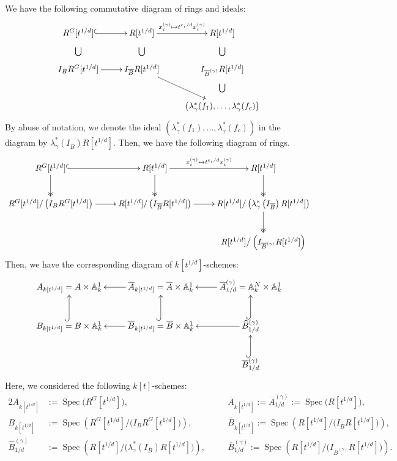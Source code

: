 \documentclass[a4paper,11pt]{amsart}
\theoremstyle{definition}
\theoremstyle{remark}
\begin{document}
We have the following commutative diagram of rings and ideals: 
\[
\xymatrix{
R^G[t^{1/d}] \ar@{^(->}[r] & R[t^{1/d}] \ar[r]^{x_i^{(\gamma)} \mapsto t^{e_i/d} x_i^{(\gamma)}} & R[t^{1/d}] \\
I_B R^G[t^{1/d}] \ar[r] \ar@{}[u]|{\bigcup} & I_{\overline{B}}R[t^{1/d}] \ar@{}[u]|{\bigcup} \ar[dr] &  I_{\overline{B}^{(\gamma)}} R[t^{1/d}] \ar@{}[u]|{\bigcup} \\
& & \left( \lambda ^* _{\gamma}(f_1), \ldots , \lambda ^* _{\gamma}(f_c) \right) \ar@{}[u]|{\bigcup}
}
\]
By abuse of notation, we denote the ideal $\left( \lambda ^* _{\gamma}(f_1), \ldots , \lambda ^* _{\gamma}(f_c) \right)$ in the diagram by $\lambda ^*_{\gamma} \left( I_{\overline{B}} \right) R[t^{1/d}]$. 
Then, we have the following diagram of rings. 
\[
\xymatrix{
R^G[t^{1/d}] \ar@{^(->}[r] \ar@{->>}[d] & R[t^{1/d}] \ar[r]^{x_i^{(\gamma)} \mapsto t^{e_i/d} x_i^{(\gamma)}} \ar@{->>}[d] & R[t^{1/d}] \ar@{->>}[d] \\
R^G[t^{1/d}]/\left( I_B R^G[t^{1/d}] \right) \ar[r] & R[t^{1/d}]/\left(  I_{\overline{B}}R[t^{1/d}] \right) \ar[r] & R[t^{1/d}]/\left(  \lambda ^*_{\gamma} \left( I_{\overline{B}} \right) R[t^{1/d}]\right) \ar@{->>}[d]\\
&& R[t^{1/d}] \big/ \left(  I_{\overline{B}^{(\gamma)}} R[t^{1/d}] \right)  \\
}
\]
Then, we have the corresponding diagram of $k[t^{1/d}]$-schemes:
\[
  \xymatrix{
A_{k[t^{1/d}]} = A \times \mathbb{A}^1_k & \overline{A}_{k[t^{1/d}]} =  \overline{A} \times \mathbb{A}^1_k \ar[l] & \overline{A}^{(\gamma)}_{1/d} = \mathbb{A}^N _k \times \mathbb{A}^1_k \ar[l] \\
B_{k[t^{1/d}]} = B \times \mathbb{A}^1_k  \ar@{^(->}[u] & \overline{B}_{k[t^{1/d}]} = \overline{B} \times \mathbb{A}^1_k \ar[l] \ar@{^(->}[u] & \widehat{B}^{(\gamma)}_{1/d} \ar[l] \ar@{^(->}[u] \\
&& \overline{B}^{(\gamma)}_{1/d} \ar@{^(->}[u]
  }
\]
Here, we considered the following $k[t]$-schemes:
\begin{alignat*}{2}
A_{k[t^{1/d}]} &:= \operatorname{Spec} \bigl ( R^G[t^{1/d}] \bigr),& \quad
	&\overline{A}_{k[t^{1/d}]} := \overline{A}^{(\gamma)}_{1/d} := \operatorname{Spec} \bigl ( R[t^{1/d}] \bigr), \\
B_{k[t^{1/d}]} &:= \operatorname{Spec} \left( R^G[t^{1/d}] \big/ \bigl ( I_B R^G[t^{1/d}] \bigr) \right),& \quad 
	& \overline{B}_{k[t^{1/d}]}:= \operatorname{Spec} \left( R[t^{1/d}] \big/\bigl(  I_{\overline{B}}R[t^{1/d}] \bigr) \right), \\
\widehat{B}^{(\gamma)}_{1/d} &:= \operatorname{Spec} \left( R[t^{1/d}] \big/ \bigl(  \lambda ^*_{\gamma} \left( I_{\overline{B}} \right) R[t^{1/d}] \bigr) \right),& \quad
& \overline{B}^{(\gamma)}_{1/d}:= \operatorname{Spec} \left( R[t^{1/d}] \big/\bigl(  I_{\overline{B}^{(\gamma)}} R[t^{1/d}] \bigr) \right). 
\end{alignat*}
\end{document}
